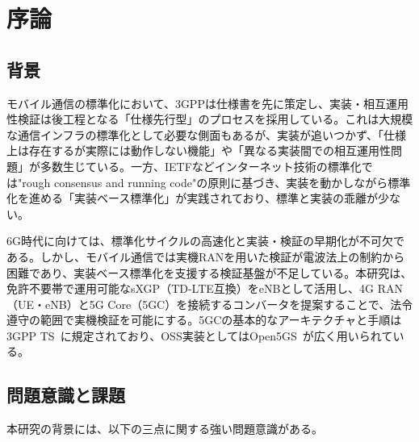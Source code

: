 \chapter{序論}

\section{背景}
モバイル通信の標準化において、3GPPは仕様書を先に策定し、実装・相互運用性検証は後工程となる「仕様先行型」のプロセスを採用している。これは大規模な通信インフラの標準化として必要な側面もあるが、実装が追いつかず、「仕様上は存在するが実際には動作しない機能」や「異なる実装間での相互運用性問題」が多数生じている。一方、IETFなどインターネット技術の標準化では"rough consensus and running code"の原則に基づき、実装を動かしながら標準化を進める「実装ベース標準化」が実践されており、標準と実装の乖離が少ない。

6G時代に向けては、標準化サイクルの高速化と実装・検証の早期化が不可欠である。しかし、モバイル通信では実機RANを用いた検証が電波法上の制約から困難であり、実装ベース標準化を支援する検証基盤が不足している。本研究は、免許不要帯で運用可能なsXGP（TD-LTE互換）をeNBとして活用し、4G RAN（UE・eNB）と5G Core（5GC）を接続するコンバータを提案することで、法令遵守の範囲で実機検証を可能にする。5GCの基本的なアーキテクチャと手順は3GPP TS~\cite{threegpp-23501,threegpp-23502}に規定されており、OSS実装としてはOpen5GS~\cite{open5gs}が広く用いられている。

\section{問題意識と課題}
本研究の背景には、以下の三点に関する強い問題意識がある。

